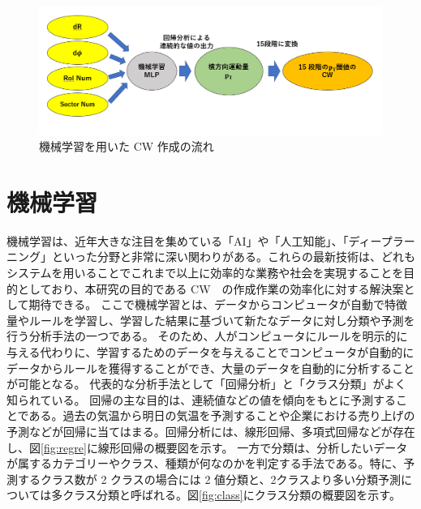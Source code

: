 \begin{figure}[tb]
  \centering
  \includegraphics[clip, width=14cm]{fig/4/MLPoverview.png}
  \caption{機械学習を用いた CW 作成の流れ}
  \label{fig:MLP_over}
\end{figure}

\section{機械学習}
機械学習は、近年大きな注目を集めている「AI」や「人工知能」、「ディープラーニング」といった分野と非常に深い関わりがある。これらの最新技術は、どれもシステムを用いることでこれまで以上に効率的な業務や社会を実現することを目的としており、本研究の目的である CW　の作成作業の効率化に対する解決案として期待できる。
ここで機械学習とは、データからコンピュータが自動で特徴量やルールを学習し、学習した結果に基づいて新たなデータに対し分類や予測を行う分析手法の一つである。
そのため、人がコンピュータにルールを明示的に与える代わりに、学習するためのデータを与えることでコンピュータが自動的にデータからルールを獲得することができ、大量のデータを自動的に分析することが可能となる。
代表的な分析手法として「回帰分析」と「クラス分類」がよく知られている。
回帰の主な目的は、連続値などの値を傾向をもとに予測することである。過去の気温から明日の気温を予測することや企業における売り上げの予測などが回帰に当てはまる。回帰分析には、線形回帰、多項式回帰などが存在し、図\ref{fig:regre}に線形回帰の概要図を示す。
一方で分類は、分析したいデータが属するカテゴリーやクラス、種類が何なのかを判定する手法である。特に、予測するクラス数が 2 クラスの場合には 2 値分類と、2クラスより多い分類予測については多クラス分類と呼ばれる。図\ref{fig:class}にクラス分類の概要図を示す。
